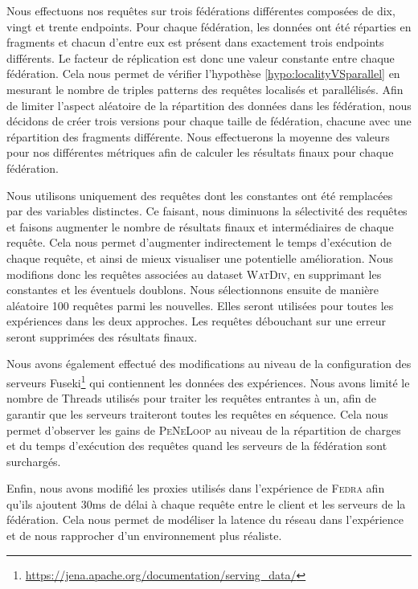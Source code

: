 \documentclass[a4paper]{article}
\def\fedra{\textsc{Fedra}\xspace}
\def\peneloop{\textsc{PeNeLoop}\xspace}
\begin{document}
Nous effectuons nos requêtes sur trois fédérations différentes composées de dix, vingt et trente endpoints. Pour chaque fédération, les données ont été réparties en fragments et chacun d'entre eux est présent dans exactement trois endpoints différents. Le facteur de réplication est donc une valeur constante entre chaque fédération. Cela nous permet de vérifier l'hypothèse \ref{hypo:localityVSparallel} en mesurant le nombre de triples patterns des requêtes localisés et parallélisés. Afin de limiter l'aspect aléatoire de la répartition des données dans les fédération, nous décidons de créer trois versions pour chaque taille de fédération, chacune avec une répartition des fragments différente. Nous effectuerons la moyenne des valeurs pour nos différentes métriques afin de calculer les résultats finaux pour chaque fédération.

Nous utilisons uniquement des requêtes dont les constantes ont été remplacées par des variables distinctes. Ce faisant, nous diminuons la sélectivité des requêtes et faisons augmenter le nombre de résultats finaux et intermédiaires de chaque requête. Cela nous permet d'augmenter indirectement le temps d'exécution de chaque requête, et ainsi de mieux visualiser une potentielle amélioration. Nous modifions donc les requêtes associées au dataset \textsc{WatDiv}, en supprimant les constantes et les éventuels doublons. Nous sélectionnons ensuite de manière aléatoire 100 requêtes parmi les nouvelles. Elles seront utilisées pour toutes les expériences dans les deux approches. Les requêtes débouchant sur une erreur seront supprimées des résultats finaux.

Nous avons également effectué des modifications au niveau de la configuration des serveurs Fuseki\footnote{\url{https://jena.apache.org/documentation/serving_data/}} qui contiennent les données des expériences. Nous avons limité le nombre de Threads utilisés pour traiter les requêtes entrantes à un, afin de garantir que les serveurs traiteront toutes les requêtes en séquence. Cela nous permet d'observer les gains de \peneloop au niveau de la répartition de charges et du temps d'exécution des requêtes quand les serveurs de la fédération sont surchargés.

Enfin, nous avons modifié les proxies utilisés dans l'expérience de \fedra afin qu'ils ajoutent 30ms de délai à chaque requête entre le client et les serveurs de la fédération. Cela nous permet de modéliser la latence du réseau dans l'expérience et de nous rapprocher d'un environnement plus réaliste.
\end{document}
